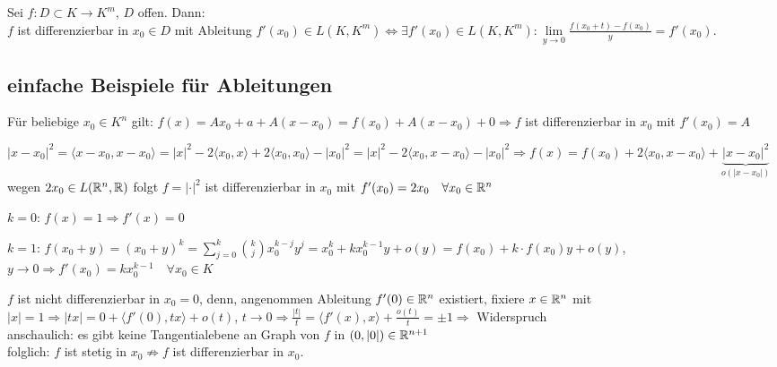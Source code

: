	\begin{folgerung}
		Sei $f:D\subset K\to K^m$, $D$ offen. Dann: \\
		$f$ ist differenzierbar in $x_0\in D$ mit Ableitung $f'(x_0)\in L(K,K^m)\iff \exists f'(x_0)\in 
		L(K,K^m):\lim\limits_{y\to 0} \frac{f(x_0+t)-f(x_0)}{y}=f'(x_0)$.
	\end{folgerung}

\subsection{einfache Beispiele für Ableitungen}
	\begin{beispiel}
		Für beliebige $x_0\in K^n$ gilt: $f(x)=Ax_0+a+A(x-x_0)=f(x_0)+A(x-x_0)+0\Rightarrow f$ ist 
		differenzierbar in $x_0$ mit $f'(x_0)=A$
	\end{beispiel}

	\begin{beispiel}[$f:\real^n\to \real$ mit $f(x)=|x|^2$]
		$|x-x_0|^2=\langle x-x_0,x-x_0\rangle=|x|^2-2\langle x_0,x\rangle+2\langle x_0,x_0\rangle-|x_0|^2=
		|x|^2-2\langle x_0,x-x_0\rangle-|x_0|^2\Rightarrow f(x)=f(x_0)+2\langle x_0,x-x_0\rangle+
		\underbrace{|x-x_0|^2}_{o(|x-x_0|)}$ \\
		wegen $2x_0\in L(\mathbb{R}^n,\mathbb{R})$ folgt $f=|\cdot |^2$ ist differenzierbar in $x_0$ mit $f'(x_0)=2x_0
		\quad\forall x_0\in \mathbb{R}^n$
	\end{beispiel}

	\begin{beispiel}[$f:K\to K$ mit $f(x)=x^k$]
		\begin{compactitem}
			\item $k=0$: $f(x)=1\Rightarrow f'(x)=0$
			\item $k=1$: $f(x_0+y)=(x_0+y)^k=\sum\limits_{j=0}^{k} \binom{k}{j} x_0^{k-j}y^j=x_0^k+
			kx_0^{k-1}y+o(y)=f(x_0)+k\cdot f(x_0)y+o(y)$, $y\to 0\Rightarrow f'(x_0)=kx_0^{k-1} 
			\quad\forall x_0\in K$
		\end{compactitem}
	\end{beispiel}

	\begin{beispiel}[$f:\real^n\to\real$ mit $f(x)=|x|$]
		$f$ ist nicht differenzierbar in $x_0=0$, denn, angenommen Ableitung $f'(0)\in \mathbb{R}^n$ existiert, 
		fixiere $x\in \mathbb{R}^n$ mit $|x|=1\Rightarrow |tx|=0+\langle f'(0),tx\rangle+o(t)$, $t\to 0\Rightarrow
		\frac{|t|}{t}=\langle f'(x),x \rangle + \frac{o(t)}{t}=\pm 1 \Rightarrow$ Widerspruch \\
		anschaulich: es gibt keine Tangentialebene an Graph von $f$ in $(0,|0|)\in \mathbb{R}^{n+1}$ \\
		folglich: $f$ ist stetig in $x_0\not\Rightarrow f$ ist differenzierbar in $x_0$.
	\end{beispiel}


